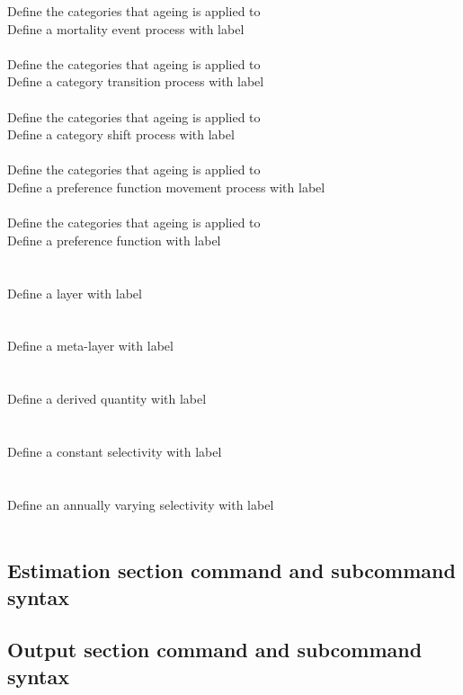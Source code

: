  {Define the categories that ageing is applied to}
\\  {Define a mortality event process with label}\\ \\
 {Define the categories that ageing is applied to}
\\  {Define a category transition process with label}\\ \\
 {Define the categories that ageing is applied to}
\\  {Define a category shift process with label}\\ \\
 {Define the categories that ageing is applied to}
\\  {Define a preference function movement process with label}\\ \\
 {Define the categories that ageing is applied to}
\\  {Define a preference function with label}\\ \\
\\  {Define a layer with label}\\ \\
\\  {Define a meta-layer with label}\\ \\
\\  {Define a derived quantity with label}\\ \\
\\  {Define a constant selectivity with label}\\ \\
\\  {Define an annually varying selectivity with label}\\ \\
\subsection*{Estimation section command and subcommand syntax}
\subsection*{Output section command and subcommand syntax}
